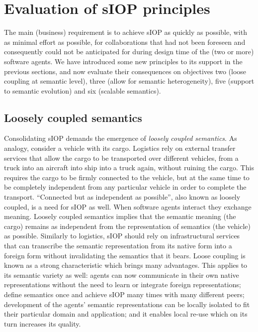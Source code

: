 \documentclass[sort&compress,preprint,authoryear,3p,twocolumn]{elsarticle}
\begin{document}
\hypertarget{evaluation-of-siop-principles}{%
\section{Evaluation of sIOP
principles}\label{evaluation-of-siop-principles}}

The main (business) requirement is to achieve sIOP as quickly as
possible, with as minimal effort as possible, for collaborations that
had not been foreseen and consequently could not be anticipated for
during design time of the (two or more) software agents. We have
introduced some new principles to its support in the previous sections,
and now evaluate their consequences on objectives two (loose coupling at
semantic level), three (allow for semantic heterogeneity), five (support
to semantic evolution) and six (scalable semantics).

\hypertarget{loosely-coupled-semantics}{%
\subsection{Loosely coupled semantics}\label{loosely-coupled-semantics}}

Consolidating sIOP demands the emergence of \emph{loosely coupled
semantics}. As analogy, consider a vehicle with its cargo. Logistics
rely on external transfer services that allow the cargo to be
transported over different vehicles, from a truck into an aircraft into
ship into a truck again, without ruining the cargo. This requires the
cargo to be firmly connected to the vehicle, but at the same time to be
completely independent from any particular vehicle in order to complete
the transport. ``Connected but as independent as possible'', also known
as loosely coupled, is a need for sIOP as well. When software agents
interact they exchange meaning. Loosely coupled semantics implies that
the semantic meaning (the cargo) remains as independent from the
representation of semantics (the vehicle) as possible. Similarly to
logistics, sIOP should rely on infrastructural services that can
transcribe the semantic representation from its native form into a
foreign form without invalidating the semantics that it bears. Loose
coupling is known as a strong characteristic which brings many
advantages. This applies to its semantic variety as well: agents can now
communicate in their own native representations without the need to
learn or integrate foreign representations; define semantics once and
achieve sIOP many times with many different peers; development of the
agents' semantic representations can be locally isolated to fit their
particular domain and application; and it enables local re-use which on
its turn increases its quality.
\end{document}
